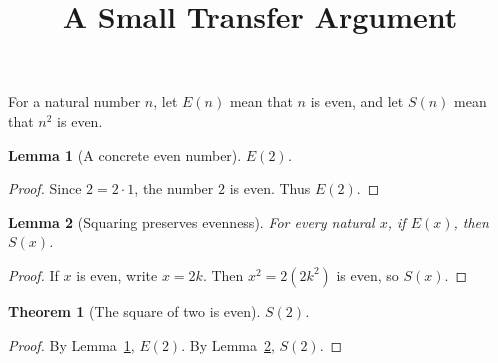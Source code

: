 \documentclass{article}
\title{A Small Transfer Argument}
\author{}
\date{}
\newtheorem{lemma}{Lemma}
\newtheorem{theorem}{Theorem}
\begin{document}
\maketitle

For a natural number $n$, let $E(n)$ mean that $n$ is even, and let $S(n)$ mean that
$n^2$ is even.

\begin{lemma}[A concrete even number]\label{lem:even-two}
$E(2)$.
\end{lemma}
\begin{proof}
Since $2=2\cdot 1$, the number $2$ is even. Thus $E(2)$.
\end{proof}

\begin{lemma}[Squaring preserves evenness]\label{lem:even-square}
For every natural $x$, if $E(x)$, then $S(x)$.
\end{lemma}
\begin{proof}
If $x$ is even, write $x=2k$. Then $x^2=2(2k^2)$ is even, so $S(x)$.
\end{proof}

\begin{theorem}[The square of two is even]\label{thm:main}
$S(2)$.
\end{theorem}
\begin{proof}
By Lemma~\ref{lem:even-two}, $E(2)$.
By Lemma~\ref{lem:even-square}, $S(2)$.
\end{proof}
\end{document}
